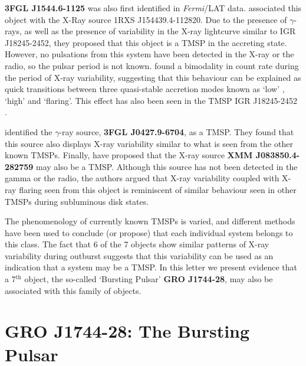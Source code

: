 \par \textbf{3FGL J1544.6-1125} was also first identified in \textit{Fermi}/LAT data. \citealp{Bogdanov_Proxy} associated this object with the X-Ray source 1RXS J154439.4-112820. Due to the presence of $\gamma$-rays, as well as the presence of variability in the X-ray lightcurve similar to IGR J18245-2452, they proposed that this object is a TMSP in the accreting state. However, no pulsations from this system have been detected in the X-ray or the radio, so the pulsar period is not known. \citealp{Bogdanov_Proxy} found a bimodality in count rate during the period of X-ray variability, suggesting that this behaviour can be explained as quick transitions between three quasi-stable accretion modes known as `low' , `high' and `flaring'. This effect has also been seen in the TMSP IGR J18245-2452 \citep{Ferrigno_TMSPVar}.
\par \citealp{Strader_6} identified the $\gamma$-ray source, \textbf{3FGL J0427.9-6704}, as a TMSP. They found that this source also displays X-ray variability similar to what is seen from the other known TMSPs. Finally, \citealp{Rea_J0838} have proposed that the X-ray source \textbf{XMM J083850.4-282759} may also be a TMSP. Although this source has not been detected in the gamma or the radio, the authors argued that X-ray variability coupled with X-ray flaring seen from this object is reminiscent of similar behaviour seen in other TMSPs during subluminous disk states.
\par The phenomenology of currently known TMSPs is varied, and different methods have been used to conclude (or propose) that each individual system belongs to this class. The fact that 6 of the 7 objects show similar patterns of X-ray variability during outburst suggests that this variability can be used as an indication that a system may be a TMSP. In this letter we present evidence that a 7$^\mathrm{th}$ object, the so-called `Bursting Pulsar' \textbf{GRO J1744-28}, may also be associated with this family of objects.

\vspace{-2em} %

\section{GRO J1744-28: The Bursting Pulsar} \label{sec:BP}


